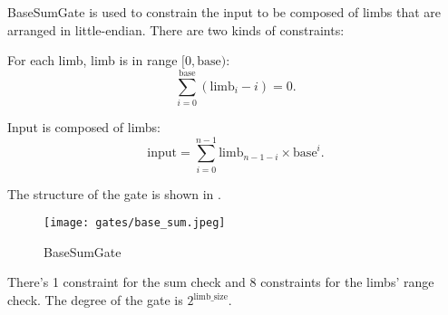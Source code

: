 
\hspace*{\fill}

\indent BaseSumGate is used to constrain the input to be composed of limbs that are arranged in little-endian. There are two kinds of constraints:

For each limb, limb is in range $[0, \text{base})$:
\[ \sum_{i=0}^{\text{base}}(\text{limb}_i - i) = 0. \]

Input is composed of limbs:
\[ \text{input} = \sum_{i=0}^{n-1} \text{limb}_{n-1-i} \times \text{base}^i. \]

The structure of the gate is shown in .
\begin{figure}[!ht]
    \centering
    \texttt{[image: gates/base\_sum.jpeg]}
    \caption{BaseSumGate}
    \label{fig:base-sum}
\end{figure}

There's 1 constraint for the sum check and 8 constraints for the limbs' range check. The degree of the gate is $2^{\text{limb\_size}}$.

